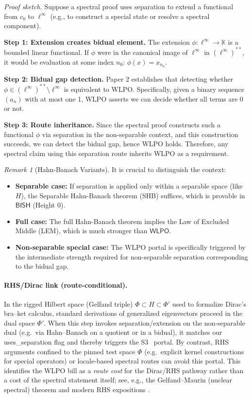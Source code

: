 \documentclass[11pt]{article}
\newcommand{\WLPO}{\mathsf{WLPO}}
\theoremstyle{plain}
\theoremstyle{definition}
\theoremstyle{remark}
\newtheorem{remark}[theorem]{Remark}
\newenvironment{prfsketch}{\noindent\textit{Proof sketch.} }{}
\newcommand{\BISH}{\mathsf{BISH}}
\begin{document}
\begin{prfsketch}
Suppose a spectral proof uses separation to extend a functional from $c_0$ to $\ell^\infty$ (e.g., to construct a special state or resolve a spectral component). 

\textbf{Step 1: Extension creates bidual element.}
The extension $\phi: \ell^\infty \to \mathbb{K}$ is a bounded linear functional. If $\phi$ were in the canonical image of $\ell^\infty$ in $(\ell^\infty)^{**}$, it would be evaluation at some index $n_0$: $\phi(x) = x_{n_0}$.

\textbf{Step 2: Bidual gap detection.}
Paper 2 establishes that detecting whether $\phi \in (\ell^\infty)^{**} \setminus \ell^\infty$ is equivalent to WLPO. 
Specifically, given a binary sequence $(a_n)$ with at most one 1, WLPO asserts we can decide whether all terms are 0 or not.

\textbf{Step 3: Route inheritance.}
Since the spectral proof constructs such a functional $\phi$ via separation in the non-separable context, 
and this construction succeeds, we can detect the bidual gap, hence WLPO holds.
Therefore, any spectral claim using this separation route inherits WLPO as a requirement.
\end{prfsketch}

\begin{remark}[Hahn-Banach Variants]
It is crucial to distinguish the context:
\begin{itemize}
\item \textbf{Separable case:} If separation is applied only within a separable space (like $H$), the Separable Hahn-Banach theorem (SHB) suffices, which is provable in $\BISH$ (Height 0). 
\item \textbf{Full case:} The full Hahn-Banach theorem implies the Law of Excluded Middle (LEM), which is much stronger than $\WLPO$.
\item \textbf{Non-separable special case:} The WLPO portal is specifically triggered by the intermediate strength required for non-separable separation corresponding to the bidual gap.
\end{itemize}
\end{remark}

\paragraph{RHS/Dirac link (route-conditional).}
In the rigged Hilbert space (Gelfand triple) $\Phi \subset H \subset \Phi'$ used to formalize Dirac's bra--ket calculus, standard derivations of generalized eigenvectors proceed in the dual space $\Phi'$. When this step invokes separation/extension on the non-separable dual (e.g.\ via Hahn--Banach on a quotient or in a bidual), it matches our \textsf{uses\_separation} flag and thereby triggers the S3 \WLPO\ portal. 
By contrast, RHS arguments confined to the pinned test space $\Phi$ (e.g.\ explicit kernel constructions for special operators) or locale-based spectral routes can avoid this portal. 
This identifies the WLPO bill as a \emph{route cost} for the Dirac/RHS pathway rather than a cost of the spectral statement itself; see, e.g., the Gelfand--Maurin (nuclear spectral) theorem and modern RHS expositions \cite{Maurin,BohmGadella,delaMadrid}.
\end{document}
